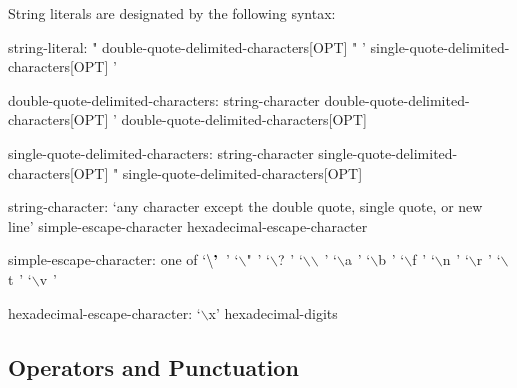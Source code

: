 String literals are designated by the following syntax:
\begin{syntax}
string-literal:
  " double-quote-delimited-characters[OPT] "
  ' single-quote-delimited-characters[OPT] '

double-quote-delimited-characters:
  string-character double-quote-delimited-characters[OPT]
  ' double-quote-delimited-characters[OPT]

single-quote-delimited-characters:
  string-character single-quote-delimited-characters[OPT]
  " single-quote-delimited-characters[OPT]

string-character:
  `any character except the double quote, single quote, or new line'
  simple-escape-character
  hexadecimal-escape-character

simple-escape-character: one of
  `$\backslash\mbox{\bf '}\hspace{5pt}$' `$\backslash$"$\hspace{5pt}$' `$\backslash$?$\hspace{5pt}$' `$\backslash$$\backslash$$\hspace{5pt}$' `$\backslash$a$\hspace{5pt}$' `$\backslash$b$\hspace{5pt}$' `$\backslash$f$\hspace{5pt}$' `$\backslash$n$\hspace{5pt}$' `$\backslash$r$\hspace{5pt}$' `$\backslash$t$\hspace{5pt}$' `$\backslash$v$\hspace{5pt}$'

hexadecimal-escape-character:
  `$\backslash$x' hexadecimal-digits
\end{syntax}

\subsection{Operators and Punctuation}
\label{Operators_and_Punctuation}

